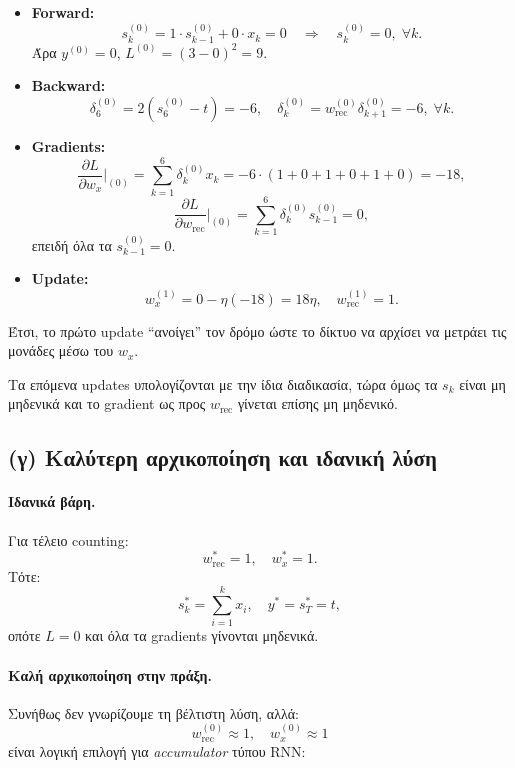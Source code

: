 \documentclass[a4paper,11pt]{article}
\begin{document}
\begin{itemize}
  \item \textbf{Forward:}
        \[
        s_k^{(0)} = 1\cdot s_{k-1}^{(0)} + 0\cdot x_k = 0
        \quad\Rightarrow\quad s_k^{(0)}=0,\;\forall k.
        \]
        Άρα $y^{(0)}=0$, $L^{(0)}=(3-0)^2=9$.
  \item \textbf{Backward:}
        \[
        \delta_6^{(0)} = 2(s_6^{(0)}-t) = -6,\quad
        \delta_k^{(0)} = w_{\mathrm{rec}}^{(0)} \delta_{k+1}^{(0)}
        = -6,\;\forall k.
        \]
  \item \textbf{Gradients:}
        \[
        \frac{\partial L}{\partial w_x}\Big|_{(0)}
        = \sum_{k=1}^6 \delta_k^{(0)} x_k
        = -6\cdot(1+0+1+0+1+0) = -18,
        \]
        \[
        \frac{\partial L}{\partial w_{\mathrm{rec}}}\Big|_{(0)}
        = \sum_{k=1}^6 \delta_k^{(0)} s_{k-1}^{(0)} = 0,
        \]
        επειδή όλα τα $s_{k-1}^{(0)}=0$.
  \item \textbf{Update:}
        \[
        w_x^{(1)} = 0 - \eta (-18) = 18\eta,\quad
        w_{\mathrm{rec}}^{(1)} = 1.
        \]
\end{itemize}

Έτσι, το πρώτο update ``ανοίγει'' τον δρόμο ώστε το δίκτυο να αρχίσει
να μετράει τις μονάδες μέσω του $w_x$.

Τα επόμενα updates υπολογίζονται με την ίδια διαδικασία, τώρα όμως
τα $s_k$ είναι μη μηδενικά και το gradient ως προς $w_{\mathrm{rec}}$
γίνεται επίσης μη μηδενικό.

\subsection{(γ) Καλύτερη αρχικοποίηση και ιδανική λύση}

\paragraph{Ιδανικά βάρη.}
Για τέλειο counting:
\[
w_{\mathrm{rec}}^\ast = 1,\quad
w_x^\ast = 1.
\]
Τότε:
\[
s_k^\ast = \sum_{i=1}^k x_i,\quad
y^\ast = s_T^\ast = t,
\]
οπότε $L=0$ και όλα τα gradients γίνονται μηδενικά.

\paragraph{Καλή αρχικοποίηση στην πράξη.}
Συνήθως δεν γνωρίζουμε τη βέλτιστη λύση, αλλά:
\[
w_{\mathrm{rec}}^{(0)} \approx 1,\quad w_x^{(0)} \approx 1
\]
είναι λογική επιλογή για \emph{accumulator} τύπου RNN:
\end{document}
